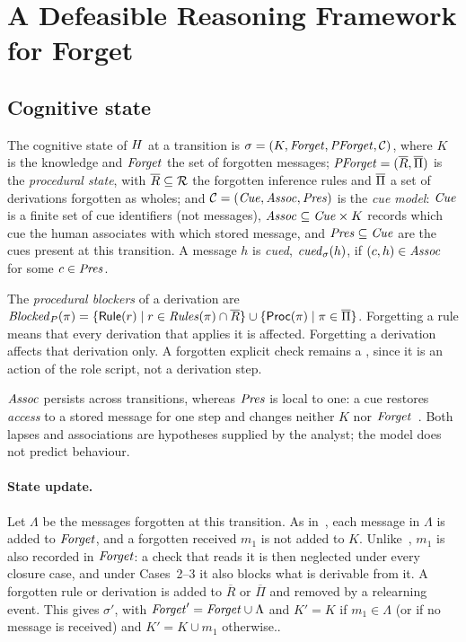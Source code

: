 \section{A Defeasible Reasoning Framework for Forget}
\label{sec:framework}

\subsection{Cognitive state}

\begin{definition}\label{def:state}
The cognitive state of $H$ at a transition is $\sigma=(K,\mathit{Forget},\mathit{PForget},\mathcal{C})$, where $K$ is the knowledge and $\mathit{Forget}$ the set of forgotten messages; $\mathit{PForget}=(\overline{R},\overline{\Pi})$ is the \emph{procedural state}, with $\overline{R}\subseteq\mathcal{R}$ the forgotten inference rules and $\overline{\Pi}$ a set of derivations forgotten as wholes; and $\mathcal{C}=(\mathit{Cue},\mathit{Assoc},\mathit{Pres})$ is the \emph{cue model}: $\mathit{Cue}$ is a finite set of cue identifiers (not messages), $\mathit{Assoc}\subseteq\mathit{Cue}\times K$ records which cue the human associates with which stored message, and $\mathit{Pres}\subseteq\mathit{Cue}$ are the cues present at this transition. A message $h$ is \emph{cued}, $\mathit{cued}_\sigma(h)$, if $(c,h)\in\mathit{Assoc}$ for some $c\in\mathit{Pres}$.
\end{definition}

The \emph{procedural blockers} of a derivation are $\mathit{Blocked}_{P}(\pi)=\{\mathsf{Rule}(r)\mid r\in\mathit{Rules}(\pi)\cap\overline{R}\}\cup\{\mathsf{Proc}(\pi)\mid\pi\in\overline{\Pi}\}$. Forgetting a rule means that every derivation that applies it is affected. Forgetting a derivation affects that derivation only. A forgotten explicit check remains a \neglect{}, since it is an action of the role script, not a derivation step. 

$\mathit{Assoc}$ persists across transitions, whereas $\mathit{Pres}$ is local to one: a cue restores \emph{access} to a stored message for one step and changes neither $K$ nor $\mathit{Forget}$~\cite{tulving1974cue}. Both lapses and associations are hypotheses supplied by the analyst; the model does not predict behaviour.

\paragraph{State update.} Let $\Lambda$ be the messages forgotten at this transition. As in~\cite{sandu2026formal}, each message in $\Lambda$ is added to $\mathit{Forget}$, and a forgotten received $m_1$ is not added to $K$. Unlike~\cite{sandu2026formal}, $m_1$ is also recorded in $\mathit{Forget}$: a check that reads it is then neglected under every closure case, and under Cases~2--3 it also blocks what is derivable from it. A forgotten rule or derivation is added to $\overline{R}$ or $\overline{\Pi}$ and removed by a relearning event. This gives $\sigma'$, with $\mathit{Forget}'=\mathit{Forget}\cup\Lambda$ and $K' = K$ if $m_1 \in \Lambda$ (or if no message is received) and $K' = K \cup {m_1}$ otherwise..

